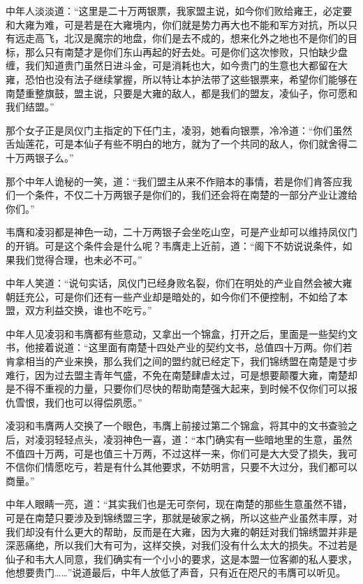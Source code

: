 中年人淡淡道：“这里是二十万两银票，我家盟主说，如今你们败给雍王，必定要和大雍为难，可是若是在大雍境内，你们就是势力再大也不能和军方对抗，所以只有远走高飞，北汉是魔宗的地盘，你们是去不成的，想来化外之地也不是你们的目标，那么只有南楚才是你们东山再起的好去处。可是你们这次惨败，只怕缺少盘缠，我们知道贵门虽然日进斗金，可是消耗也大，如今贵门的生意也大都留在大雍，恐怕也没有法子继续掌握，所以特让本护法带了这些银票来，希望你们能够在南楚重整旗鼓，盟主说，只要是大雍的敌人，都是我们的盟友，凌仙子，你可愿和我们结盟。”

那个女子正是凤仪门主指定的下任门主，凌羽，她看向银票，冷冷道：“你们虽然舌灿莲花，可是本仙子有些不明白的地方，就为了一个共同的敌人，你们就舍得二十万两银子么。”

那个中年人诡秘的一笑，道：“我们盟主从来不作赔本的事情，若是你们肯答应我们一个条件，不仅二十万两银子是你们的，我们还会将在南楚的一部分产业让渡给你们。”

韦膺和凌羽都是神色一动，二十万两银子会坐吃山空，可是产业却可以维持凤仪门的开销。可是这个条件会是什么呢？韦膺走上近前，道：“阁下不妨说说条件，如果我们觉得合理，也未必不可。”

中年人笑道：“说句实话，凤仪门已经身败名裂，你们在明处的产业自然会被大雍朝廷充公，可是你们还有一些产业却是暗处的，如今你们不便控制，不如给了本盟，双方利益交换，谁也不吃亏。”

中年人见凌羽和韦膺都有些意动，又拿出一个锦盒，打开之后，里面是一些契约文书，他接着说道：“这里面有南楚十四处产业的契约文书，总值四十万两。你们若肯拿相当的产业来换，那么我们之间的盟约就已经定下，我们锦绣盟在南楚是寸步难行，因为过去盟主青年气盛，不免在南楚肆虐太过，可是想要颠覆大雍，南楚却是不得不重视的力量，只要你们尽快的帮助南楚强大起来，到时候不仅你们可以报仇雪恨，我们也可以得偿夙愿。”

凌羽和韦膺两人交换了一个眼色，韦膺上前接过第二个锦盒，将其中的文书查验之后，对凌羽轻轻点头，凌羽神色一喜，道：“本门确实有一些暗地里的生意，虽然不值四十万两，可是也值三十万两，不过这样一来，你们可是大大受了损失，我可不信你们情愿吃亏，若是有什么其他要求，不妨明言，只要不大过分，我们都可以商量。”

中年人眼睛一亮，道：“其实我们也是无可奈何，现在南楚的那些生意虽然不错，可是在南楚只要涉及到锦绣盟三字，那就是破家之祸，所以这些产业虽然丰厚，对我们却没有什么更大的帮助，反而是在大雍，因为大雍的朝廷对我们锦绣盟并非是深恶痛绝，所以我们大有可为，这样交换，对我们没有什么太大的损失。不过若是仙子和韦大人同意，我们确实有一个小小的要求，这是本盟一位客卿的私人要求，他想要贵门……”说道最后，中年人放低了声音，只有近在咫尺的韦膺可以听见。


